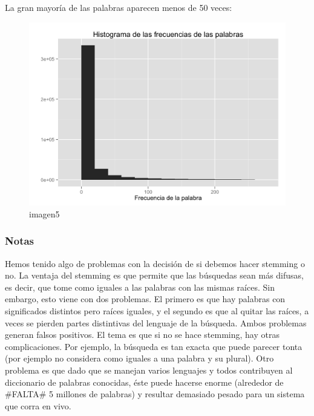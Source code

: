 La gran mayoría de las palabras aparecen menos de 50 veces:

\begin{figure}[H]
\centering
\includegraphics[width=1\textwidth]{Figures/L3.png}
\caption{imagen5}
\label{}
\end{figure}

\subsubsection{Notas}\label{notas}

Hemos tenido algo de problemas con la decisión de si debemos hacer
stemming o no. La ventaja del stemming es que permite que las búsquedas
sean más difusas, es decir, que tome como iguales a las palabras con las
mismas raíces. Sin embargo, esto viene con dos problemas. El primero es
que hay palabras con significados distintos pero raíces iguales, y el
segundo es que al quitar las raíces, a veces se pierden partes
distintivas del lenguaje de la búsqueda. Ambos problemas generan falsos
positivos. El tema es que si no se hace stemming, hay otras
complicaciones. Por ejemplo, la búsqueda es tan exacta que puede parecer
tonta (por ejemplo no considera como iguales a una palabra y su plural).
Otro problema es que dado que se manejan varios lenguajes y todos
contribuyen al diccionario de palabras conocidas, éste puede hacerse
enorme (alrededor de \#FALTA\# 5 millones de palabras) y resultar
demasiado pesado para un sistema que corra en vivo.


